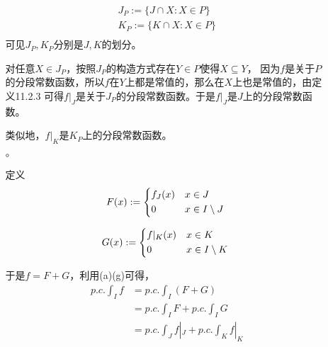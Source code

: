 \documentclass{article}
\begin{document}
\begin{itemize}
\begin{itemize}
                \begin{align*}
                  J_P := \{J \cap X: X \in P\} \\
                  K_P := \{K \cap X: X \in P\} \\
                \end{align*}
                可见$J_P, K_P$分别是$J, K$的划分。

                对任意$X \in J_P$，按照$J_P$的构造方式存在$Y \in P$使得$X \subseteq Y$，
                因为$f$是关于$P$的分段常数函数，所以$f$在$Y$上都是常值的，那么在$X$上也是常值的，由定义11.2.3
                可得$f|_J$是关于$J_P$的分段常数函数。于是$f|_J$是$J$上的分段常数函数。

                类似地，$f|_K$是$K_P$上的分段常数函数。

          \item[$\circ$]

                定义
                \begin{equation*}
                  F(x) :=
                  \begin{cases*}
                    f_J(x) & $x \in J$             \\
                    0      & $x \in I \setminus J$
                  \end{cases*}
                \end{equation*}

                \begin{equation*}
                  G(x) :=
                  \begin{cases*}
                    f|_K(x) & $x \in K$             \\
                    0       & $x \in I \setminus K$
                  \end{cases*}
                \end{equation*}

                于是$f = F + G$，利用(a)(g)可得，
                \begin{align*}
                  p.c.\int_{I} f & = p.c.\int_{I} (F + G)                  \\
                                 & = p.c.\int_{I} F + p.c.\int_{I} G       \\
                                 & = p.c.\int_{J} f|_J + p.c.\int_{K} f|_K \\
                \end{align*}
        \end{itemize}
\end{itemize}
\end{document}
